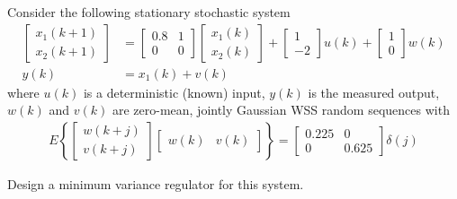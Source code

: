 \item
Consider the following stationary stochastic system
\begin{align}
    \begin{bmatrix}
            x_1(k+1) \\
            x_2(k+1)
        \end{bmatrix} & = \begin{bmatrix}
            0.8 & 1 \\
            0 & 0
        \end{bmatrix} \begin{bmatrix}
            x_1(k) \\
            x_2(k)
        \end{bmatrix} + \begin{bmatrix}
            1 \\
            -2
        \end{bmatrix} u(k) + \begin{bmatrix}
            1 \\
            0
        \end{bmatrix} w(k)
        \label{eq:sysx} \\
    y(k) & = x_1(k) + v(k) \nonumber %
\end{align}
where
$u(k)$ is a deterministic (known) input,
$y(k)$ is the measured output,
$w(k)$ and $v(k)$ are zero-mean, jointly Gaussian WSS random sequences with
\begin{gather*}
    E \left \{ \begin{bmatrix} w(k+j) \\ v(k+j) \end{bmatrix} \begin{bmatrix} w(k) & v(k) \end{bmatrix} \right\}
        = \begin{bmatrix} 0.225 & 0 \\ 0 & 0.625 \end{bmatrix} \delta(j) %
\end{gather*}

Design a minimum variance regulator for this system. 



